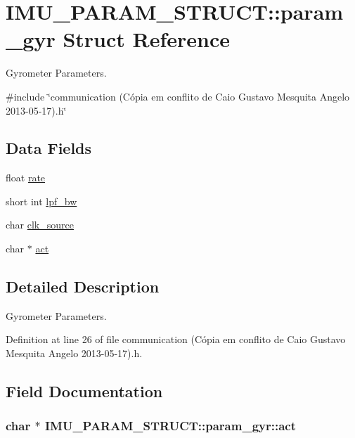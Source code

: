 \hypertarget{structIMU__PARAM__STRUCT_1_1param__gyr}{\section{I\-M\-U\-\_\-\-P\-A\-R\-A\-M\-\_\-\-S\-T\-R\-U\-C\-T\-:\-:param\-\_\-gyr Struct Reference}
\label{structIMU__PARAM__STRUCT_1_1param__gyr}
}


Gyrometer Parameters.  




{\ttfamily \#include \char`\"{}communication (\-Cópia em conflito de Caio Gustavo Mesquita Angelo 2013-\/05-\/17).\-h\char`\"{}}

\subsection*{Data Fields}
\begin{DoxyCompactItemize}
\item 
float \hyperlink{structIMU__PARAM__STRUCT_1_1param__gyr_a5aa70e1e9634411c89aacfbc570cc91c}{rate}
\item 
short int \hyperlink{structIMU__PARAM__STRUCT_1_1param__gyr_aa612f7299b43a1bf1fc597688c2fa02d}{lpf\-\_\-bw}
\item 
char \hyperlink{structIMU__PARAM__STRUCT_1_1param__gyr_aca3b791cb480f2da4703d4c256a7de48}{clk\-\_\-source}
\item 
char $\ast$ \hyperlink{structIMU__PARAM__STRUCT_1_1param__gyr_a8b583edb905ed922572e46453e7d4adf}{act}
\end{DoxyCompactItemize}


\subsection{Detailed Description}
Gyrometer Parameters. 

Definition at line 26 of file communication (\-Cópia em conflito de Caio Gustavo Mesquita Angelo 2013-\/05-\/17).\-h.



\subsection{Field Documentation}
\hypertarget{structIMU__PARAM__STRUCT_1_1param__gyr_a8b583edb905ed922572e46453e7d4adf}{
\subsubsection[{act}]{\setlength{\rightskip}{0pt plus 5cm}char $\ast$ I\-M\-U\-\_\-\-P\-A\-R\-A\-M\-\_\-\-S\-T\-R\-U\-C\-T\-::param\-\_\-gyr\-::act}}\label{structIMU__PARAM__STRUCT_1_1param__gyr_a8b583edb905ed922572e46453e7d4adf}



